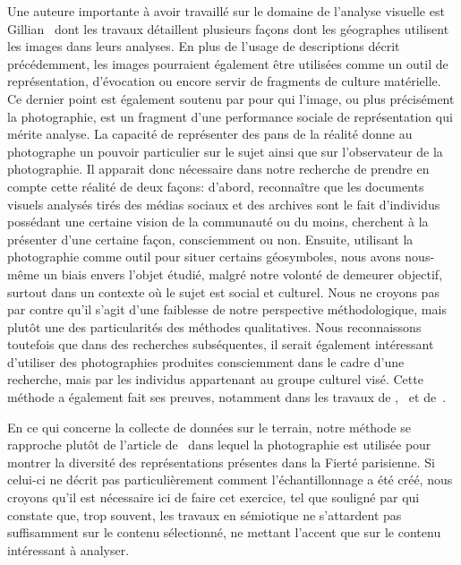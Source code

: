 Une auteure importante à avoir travaillé sur le domaine de l'analyse visuelle est Gillian~\citet{Rose2008} dont les travaux détaillent plusieurs façons dont les géographes utilisent les images dans leurs analyses.
En plus de l'usage de descriptions décrit précédemment, les images pourraient également être utilisées comme un outil de représentation, d'évocation ou encore servir de fragments de culture matérielle.
Ce dernier point est également soutenu par \citet{Frosh2001} pour qui l'image, ou plus précisément la photographie, est un fragment d'une performance sociale de représentation qui mérite analyse.
La capacité de représenter des pans de la réalité donne au photographe un pouvoir particulier sur le sujet ainsi que sur l'observateur de la photographie.
Il apparait donc nécessaire dans notre recherche de prendre en compte cette réalité de deux façons: d'abord, reconnaître que les documents visuels analysés tirés des médias sociaux et des archives sont le fait d'individus possédant une certaine vision de la communauté \lgbt{} ou du moins, cherchent à la présenter d'une certaine façon, consciemment ou non.
Ensuite, utilisant la photographie comme outil pour situer certains géosymboles, nous avons nous-même un biais envers l'objet étudié, malgré notre volonté de demeurer objectif, surtout dans un contexte où le sujet est social et culturel.
Nous ne croyons pas par contre qu'il s'agit d'une faiblesse de notre perspective méthodologique, mais plutôt une des particularités des méthodes qualitatives.
Nous reconnaissons toutefois que dans des recherches subséquentes, il serait également intéressant d'utiliser des photographies produites consciemment dans le cadre d'une recherche, mais par les individus appartenant au groupe culturel visé.
Cette méthode a également fait ses preuves, notamment dans les travaux de \citet{Kwan2008},~\citet{Moore2008} et de~\citet{Markwell2000}.

En ce qui concerne la collecte de données sur le terrain, notre méthode se rapproche plutôt de l'article de~\citet{Leroy2010} dans lequel la photographie est utilisée pour montrer la diversité des représentations présentes dans la Fierté parisienne.
Si celui-ci ne décrit pas particulièrement comment l'échantillonnage a été créé, nous croyons qu'il est nécessaire ici de faire cet exercice, tel que souligné par \citet[109]{Rose2012} qui constate que, trop souvent, les travaux en sémiotique ne s'attardent pas suffisamment sur le contenu sélectionné, ne mettant l'accent que sur le contenu intéressant à analyser.



